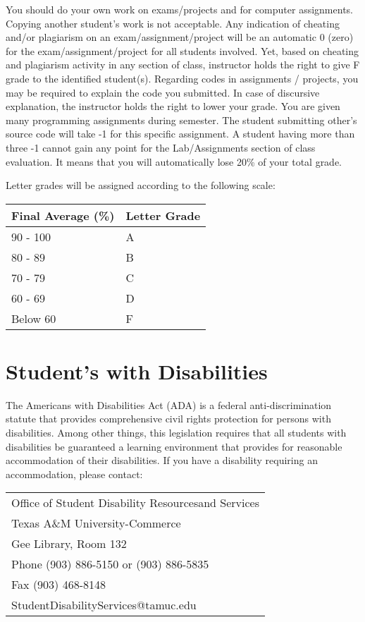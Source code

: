 \documentclass[11pt]{article}
\begin{document}
You should do your own work on exams/projects and for computer
assignments. Copying another student’s work is not acceptable. Any
indication of cheating and/or plagiarism on an exam/assignment/project
will be an automatic 0 (zero) for the exam/assignment/project for all
students involved. Yet, based on cheating and plagiarism activity in
any section of class, instructor holds the right to give F grade to
the identified student(s). Regarding codes in assignments / projects,
you may be required to explain the code you submitted. In case of
discursive explanation, the instructor holds the right to lower your
grade. You are given many programming assignments during semester. The
student submitting other’s source code will take -1 for this specific
assignment. A student having more than three -1 cannot gain any point
for the Lab/Assignments section of class evaluation. It means that you
will automatically lose 20\% of your total grade.

Letter grades will be assigned according to the following scale:


\begin{center}
\begin{tabular*}{0.9\textwidth}{ll}
 Final Average (\%)  &  Letter Grade  \\
\hline
 90 - 100            &  A             \\
 80 - 89             &  B             \\
 70 - 79             &  C             \\
 60 - 69             &  D             \\
 Below 60            &  F             \\
\end{tabular*}
\end{center}
\section*{Student's with Disabilities}
\label{sec-7}


The Americans with Disabilities Act (ADA) is a federal
anti-discrimination statute that provides comprehensive civil rights
protection for persons with disabilities.  Among other things, this
legislation requires that all students with disabilities be guaranteed
a learning environment that provides for reasonable accommodation of
their disabilities.  If you have a disability requiring an
accommodation, please contact: 


\begin{center}
\begin{tabular*}{0.9\textwidth}{l}
 Office of Student Disability Resourcesand Services  \\
 Texas A\&M University-Commerce                      \\
 Gee Library, Room 132                               \\
 Phone (903) 886-5150 or (903) 886-5835              \\
 Fax (903) 468-8148                                  \\
 StudentDisabilityServices@tamuc.edu                 \\
\end{tabular*}
\end{center}
\end{document}
